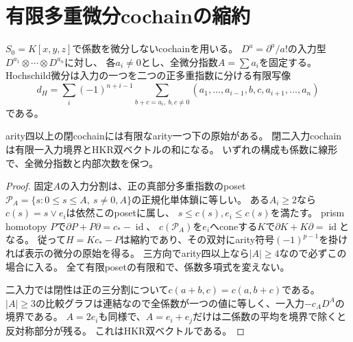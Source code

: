 \section{有限多重微分cochainの縮約}
$S_0=K[x,y,z]$で係数を微分しないcochainを用いる。
$D^a=\partial^a/a!$の入力型$D^{a_1}\otimes\cdots\otimes D^{a_n}$に対し、
各$a_i\ne0$とし、全微分指数$A=\sum a_i$を固定する。
Hochschild微分は入力の一つを二つの正多重指数に分ける有限写像
\[
 d_H=\sum_i(-1)^{n+i-1}\sum_{b+c=a_i,\ b,c\ne0}
 (a_1,\ldots,a_{i-1},b,c,a_{i+1},\ldots,a_n)
\]
である。
\begin{lemma}\label{mix:cobar}
arity四以上の閉cochainには有限なarity一つ下の原始がある。
閉二入力cochainは有限一入力境界とHKR双ベクトルの和になる。
いずれの構成も係数に線形で、全微分指数と内部次数を保つ。
\end{lemma}
\begin{proof}
固定$A$の入力分割は、正の真部分多重指数のposet
$\mathcal P_A=\{s:0\le s\le A,\ s\ne0,A\}$の正規化単体鎖に等しい。
ある$A_i\ge2$なら$c(s)=s\vee e_i$は依然このposetに属し、
$s\le c(s),e_i\le c(s)$を満たす。
prism homotopy $P$で$\partial P+P\partial=c_*-\operatorname{id}$、
$c(\mathcal P_A)$を$e_i$へconeする$K$で$\partial K+K\partial=\operatorname{id}$となる。
従って$H=Kc_*-P$は縮約であり、その双対にarity符号$(-1)^{p-1}$を掛ければ表示の微分の原始を得る。
三方向でarity四以上なら$|A|\ge4$なので必ずこの場合に入る。
全て有限posetの有限和で、係数多項式を変えない。

二入力では閉性は正の三分割について$c(a+b,c)=c(a,b+c)$である。
$|A|\ge3$の比較グラフは連結なので全係数が一つの値に等しく、一入力$-c_AD^A$の境界である。
$A=2e_i$も同様で、$A=e_i+e_j$だけは二係数の平均を境界で除くと反対称部分が残る。
これはHKR双ベクトルである。
\end{proof}

